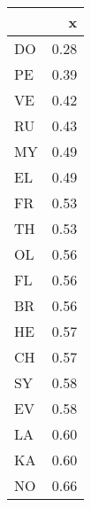 
\begin{tabular}[t]{l|r}
\hline
  & x\\
\hline
DO & 0.28\\
\hline
PE & 0.39\\
\hline
VE & 0.42\\
\hline
RU & 0.43\\
\hline
MY & 0.49\\
\hline
EL & 0.49\\
\hline
FR & 0.53\\
\hline
TH & 0.53\\
\hline
OL & 0.56\\
\hline
FL & 0.56\\
\hline
BR & 0.56\\
\hline
HE & 0.57\\
\hline
CH & 0.57\\
\hline
SY & 0.58\\
\hline
EV & 0.58\\
\hline
LA & 0.60\\
\hline
KA & 0.60\\
\hline
NO & 0.66\\
\hline
\end{tabular}
